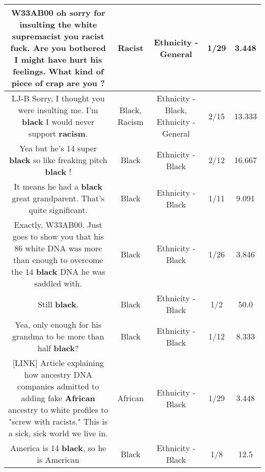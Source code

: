 \documentclass[11pt]{article}
\newlength\mylength
\begin{document}
\begin{center}
\begin{longtable}{|C{.65\mylength}|C{.30\mylength}|C{.12\mylength}|C{.12\mylength}|C{.12\mylength}|}
  \small W33AB00 oh sorry for insulting the white supremacist you \textbf{racist} fuck. Are you bothered I might have hurt his feelings. What kind of piece of crap are you ?\normalsize   & Racist & Ethnicity - General & 1/29 & 3.448 \\  \hline
  \small LJ-B Sorry, I thought you were insulting me. I'm \textbf{black} I would never support \textbf{racism}.\normalsize   & Black, Racism & Ethnicity - Black, Ethnicity - General & 2/15 & 13.333 \\  \hline
  \small Yea but he's 14 super \textbf{black} so like freaking pitch \textbf{black} !\normalsize   & Black & Ethnicity - Black & 2/12 & 16.667 \\  \hline
  \small It means he had a \textbf{black} great grandparent. That's quite significant.\normalsize   & Black & Ethnicity - Black & 1/11 & 9.091 \\  \hline
  \small Exactly, W33AB00.  Just goes to show you that his 86 white DNA was more than enough to overcome the 14 \textbf{black} DNA he was saddled with.\normalsize   & Black & Ethnicity - Black & 1/26 & 3.846 \\  \hline
  \small Still \textbf{black}.\normalsize   & Black & Ethnicity - Black & 1/2 & 50.0 \\  \hline
  \small Yea, only enough for his grandma to be more than half \textbf{black}?\normalsize   & Black & Ethnicity - Black & 1/12 & 8.333 \\  \hline
  \small  [LINK] Article explaining how ancestry DNA companies admitted to adding fake \textbf{African} ancestry to white profiles to "screw with racists."  This is a sick, sick world we live in.\normalsize   & African & Ethnicity - Black & 1/29 & 3.448 \\  \hline
  \small America is 14 \textbf{black}, so he is American\normalsize   & Black & Ethnicity - Black & 1/8 & 12.5 \\  \hline

\end{longtable}
\end{center}
\end{document}

